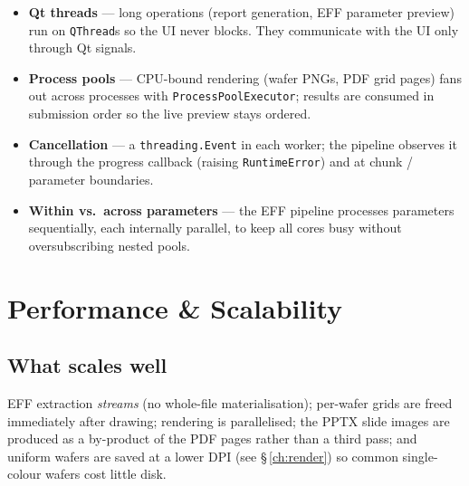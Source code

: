 \documentclass[11pt,a4paper]{report}
\newcommand{\code}[1]{\texttt{#1}}
\begin{document}
\begin{itemize}[leftmargin=1.4em]
  \item \textbf{Qt threads} — long operations (report generation, EFF parameter
        preview) run on \code{QThread}s so the UI never blocks. They communicate
        with the UI only through Qt signals.
  \item \textbf{Process pools} — CPU-bound rendering (wafer PNGs, PDF grid pages)
        fans out across processes with \code{ProcessPoolExecutor}; results are
        consumed in submission order so the live preview stays ordered.
  \item \textbf{Cancellation} — a \code{threading.Event} in each worker; the
        pipeline observes it through the progress callback (raising
        \code{RuntimeError}) and at chunk / parameter boundaries.
  \item \textbf{Within vs.\ across parameters} — the EFF pipeline processes
        parameters sequentially, each internally parallel, to keep all cores busy
        without oversubscribing nested pools.
\end{itemize}

\chapter{Performance \& Scalability}\label{ch:perf}

\section{What scales well}
EFF extraction \emph{streams} (no whole-file materialisation); per-wafer grids are
freed immediately after drawing; rendering is parallelised; the PPTX slide images
are produced as a by-product of the PDF pages rather than a third pass; and
uniform wafers are saved at a lower DPI (see \S\,\ref{ch:render}) so common
single-colour wafers cost little disk.
\end{document}

